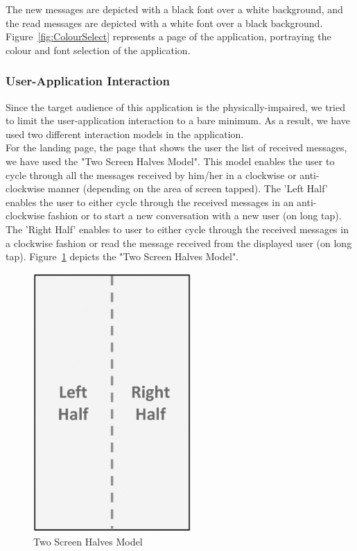 \documentclass[14pt]{report}
\begin{document}
					The new messages are depicted with a black font over a white background, and the read messages are depicted with a white font over a black background. Figure~\ref{fig:ColourSelect} represents a page of the application, portraying the colour and font selection of the application.
				\subsubsection{User-Application Interaction}
					Since the target audience of this application is the physically-impaired, we tried to limit the user-application interaction to a bare minimum. As a result, we have used two different interaction models in the application.\\

					For the landing page, the page that shows the user the list of received messages, we have used the "Two Screen Halves Model". This model enables the user to cycle through all the messages received by him/her in a clockwise or anti-clockwise manner (depending on the area of screen tapped). The 'Left Half' enables the user to either cycle through the received messages in an anti-clockwise fashion or to start a new conversation with a new user (on long tap). The 'Right Half' enables to user to either cycle through the received messages in a clockwise fashion or read the message received from the displayed user (on long tap). Figure~\ref{fig:2half} depicts the "Two Screen Halves Model".\\
					\begin{figure}[h]
						\includegraphics[width=6cm]{2half.png}
						\centering
						\caption{Two Screen Halves Model}
						\label{fig:2half}
					\end{figure} 
\end{document}
